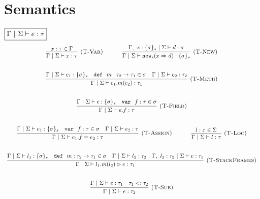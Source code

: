 \documentclass{llncs}
\newcommand{\keywadj}[1]{\mathtt{#1}}
\newcommand{\keyw}[1]{\keywadj{#1}~}
\begin{document}
\newpage

\section{Semantics}

$\fbox{$\Gamma~|~\Sigma \vdash e : \tau$}$
\[
\begin{array}{c}
\infer[\textsc{(T-Var)}]
  {\Gamma~|~\Sigma \vdash x : \tau}
  {x : \tau \in \Gamma}%
~~~~~~~~~~
\infer[\textsc{(T-New)}]
	{\Gamma~|~\Sigma \vdash \keywadj{new}_{s}(x \Rightarrow d) : \{ \sigma \}_{s}}
	{\Gamma,~x : \{ \sigma \}_{s}~|~\Sigma \vdash d : \sigma} \\[5ex]

\infer[\textsc{(T-Meth)}]
	{\Gamma~|~\Sigma \vdash e_1.m(e_2) : \tau_1} 
	{\Gamma~|~\Sigma \vdash e_1 : \{\sigma\}_s  & \keyw{def}~ m : \tau_2 \rightarrow \tau_1 \in \sigma & \Gamma~|~\Sigma \vdash e_2 : \tau_2}\\[5ex]

\infer[\textsc{(T-Field)}]
	{\Gamma~|~\Sigma \vdash  e.f : \tau} 
	{\Gamma~|~\Sigma \vdash e : \{\sigma\}_s & \keyw{var}~ f : \tau \in \sigma}\\[5ex]
	
\infer[\textsc{(T-Assign)}]
	{\Gamma~|~\Sigma \vdash  e_1.f=e_2 : \tau} 
	{\Gamma~|~\Sigma \vdash e_1 : \{\sigma\}_s & \keyw{var}~ f : \tau \in \sigma & \Gamma~|~\Sigma \vdash e_2 : \tau}%
~~~~~~~~~~
\infer[\textsc{(T-Loc)}]
  {\Gamma~|~\Sigma \vdash l : \tau}
  {l : \tau \in \Sigma}\\[5ex]

\infer[\textsc{(T-StackFrames)}]
	{\Gamma~|~\Sigma \vdash l_1.m(l_2) \rhd e : \tau_1}
	{\Gamma~|~\Sigma \vdash l_1 : \{\sigma\}_s & \keyw{def}~ m : \tau_2 \rightarrow \tau_1 \in \sigma & \Gamma~|~\Sigma \vdash l_2 : \tau_2 & \Gamma,~l_2 : \tau_2~|~\Sigma \vdash e : \tau_1} \\[5ex]

\infer[\textsc{(T-Sub)}]
  {\Gamma~|~\Sigma \vdash e : \tau_2}
  {\Gamma~|~\Sigma \vdash e : \tau_1 & \tau_1 <: \tau_2}\\[5ex]

\end{array}
\]
\end{document}
